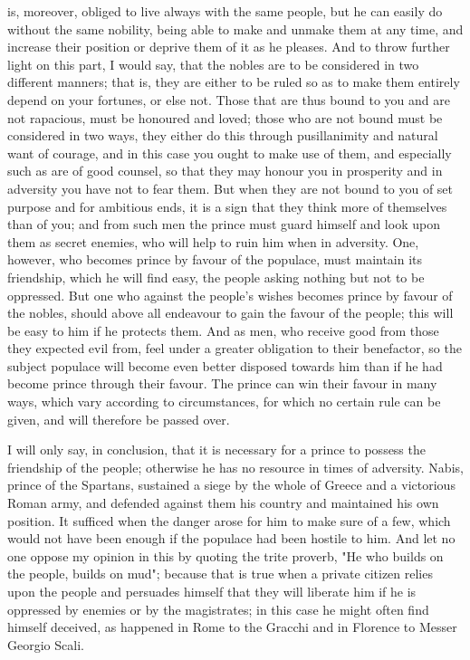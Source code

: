 \documentclass[12pt,letterpaper]{memoir}
\begin{document}
is, moreover, obliged to live always with the same people, but he can
easily do without the same nobility, being able to make and unmake them
at any time, and increase their position or deprive them of it as he
pleases. And to throw further light on this part, I would say, that the
nobles are to be considered in two different manners; that is, they are
either to be ruled so as to make them entirely depend on your fortunes,
or else not. Those that are thus bound to you and are not rapacious,
must be honoured and loved; those who are not bound must be considered
in two ways, they either do this through pusillanimity and natural
want of courage, and in this case you ought to make use of them, and
especially such as are of good counsel, so that they may honour you in
prosperity and in adversity you have not to fear them. But when they
are not bound to you of set purpose and for ambitious ends, it is a
sign that they think more of themselves than of you; and from such men
the prince must guard himself and look upon them as secret enemies,
who will help to ruin him when in adversity. One, however, who becomes
prince by favour of the populace, must maintain its friendship, which
he will find easy, the people asking nothing but not to be oppressed.
But one who against the people's wishes becomes prince by favour of
the nobles, should above all endeavour to gain the favour of the
people; this will be easy to him if he protects them. And as men, who
receive good from those they expected evil from, feel under a greater
obligation to their benefactor, so the subject populace will become
even better disposed towards him than if he had become prince through
their favour. The prince can win their favour in many ways, which vary
according to circumstances, for which no certain rule can be given, and
will therefore be passed over.

I will only say, in conclusion, that it is necessary for a prince to
possess the friendship of the people; otherwise he has no resource in
times of adversity. Nabis, prince of the Spartans, sustained a siege by
the whole of Greece and a victorious Roman army, and defended against
them his country and maintained his own position. It sufficed when the
danger arose for him to make sure of a few, which would not have been
enough if the populace had been hostile to him. And let no one oppose
my opinion in this by quoting the trite proverb, "He who builds on the
people, builds on mud"; because that is true when a private citizen
relies upon the people and persuades himself that they will liberate
him if he is oppressed by enemies or by the magistrates; in this case
he might often find himself deceived, as happened in Rome to the
Gracchi and in Florence to Messer Georgio Scali.
\end{document}
